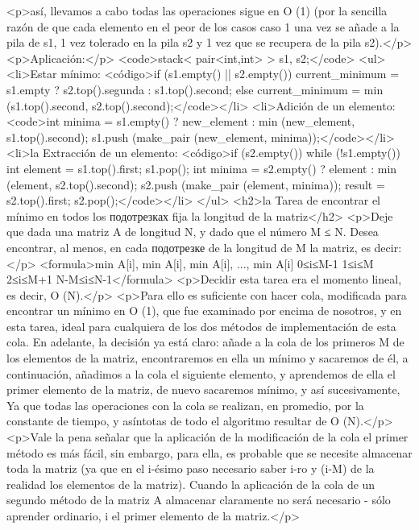 <p>así, llevamos a cabo todas las operaciones sigue en O (1) (por la sencilla razón de que cada elemento en el peor de los casos caso 1 una vez se añade a la pila de s1, 1 vez tolerado en la pila s2 y 1 vez que se recupera de la pila s2).</p>
<p>Aplicación:</p>
<code>stack< pair<int,int> > s1, s2;</code>
<ul>
<li>Estar mínimo:
<código>if (s1.empty() || s2.empty())
current_minimum = s1.empty ? s2.top().segunda : s1.top().second;
else
current_minimum = min (s1.top().second, s2.top().second);</code></li>
<li>Adición de un elemento:
<code>int minima = s1.empty() ? new_element : min (new_element, s1.top().second);
s1.push (make_pair (new_element, minima));</code></li>
<li>la Extracción de un elemento:
<código>if (s2.empty())
while (!s1.empty()) {
int element = s1.top().first;
s1.pop();
int minima = s2.empty() ? element : min (element, s2.top().second);
s2.push (make_pair (element, minima));
}
result = s2.top().first;
s2.pop();</code></li>
</ul>
<h2>la Tarea de encontrar el mínimo en todos los подотрезках fija la longitud de la matriz</h2>
<p>Deje que dada una matriz A de longitud N, y dado que el número M ≤ N. Desea encontrar, al menos, en cada подотрезке de la longitud de M la matriz, es decir:</p>
<formula>min A[i], min A[i], min A[i], ..., min A[i]
0≤i≤M-1 1≤i≤M 2≤i≤M+1 N-M≤i≤N-1</formula>
<p>Decidir esta tarea era el momento lineal, es decir, O (N).</p>
<p>Para ello es suficiente con hacer cola, modificada para encontrar un mínimo en O (1), que fue examinado por encima de nosotros, y en esta tarea, ideal para cualquiera de los dos métodos de implementación de esta cola. En adelante, la decisión ya está claro: añade a la cola de los primeros M de los elementos de la matriz, encontraremos en ella un mínimo y sacaremos de él, a continuación, añadimos a la cola el siguiente elemento, y aprendemos de ella el primer elemento de la matriz, de nuevo sacaremos mínimo, y así sucesivamente, Ya que todas las operaciones con la cola se realizan, en promedio, por la constante de tiempo, y asíntotas de todo el algoritmo resultar de O (N).</p>
<p>Vale la pena señalar que la aplicación de la modificación de la cola el primer método es más fácil, sin embargo, para ella, es probable que se necesite almacenar toda la matriz (ya que en el i-ésimo paso necesario saber i-ro y (i-M) de la realidad los elementos de la matriz). Cuando la aplicación de la cola de un segundo método de la matriz A almacenar claramente no será necesario - sólo aprender ordinario, i el primer elemento de la matriz.</p>